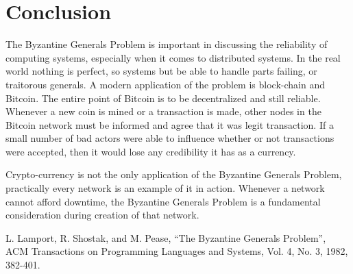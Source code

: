 \documentclass[10pt]{amsart}
\begin{document}
\section{Conclusion}

The Byzantine Generals Problem is important in discussing the reliability of computing systems,
especially when it comes to distributed systems. In the real world nothing is perfect, so systems
but be able to handle parts failing, or traitorous generals. A modern application of the problem
is block-chain and Bitcoin. The entire point of Bitcoin is to be decentralized and still reliable.
Whenever a new coin is mined or a transaction is made, other nodes in the Bitcoin network must be
informed and agree that it was legit transaction. If a small number of bad actors were able to
influence whether or not transactions were accepted, then it would lose any credibility it has as a
currency.

Crypto-currency is not the only application of the Byzantine Generals Problem, practically every
network is an example of it in action. Whenever a network cannot afford downtime, the Byzantine
Generals Problem is a fundamental consideration during creation of that network. 



\begin{thebibliography}{10}

 {
    L. Lamport, R. Shostak, and M. Pease, ``The Byzantine Generals Problem'', ACM Transactions on 
    Programming Languages and Systems, Vol. 4, No. 3, 1982, 382-401.
}
\end{thebibliography}
\end{document}
